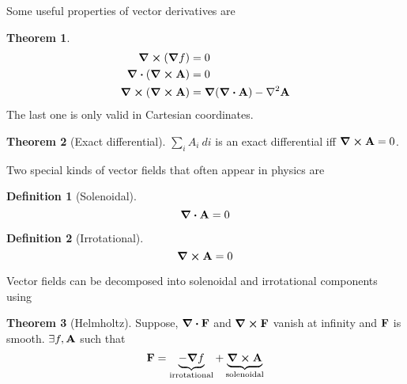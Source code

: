 \documentclass[10pt, a4paper]{extarticle}
\theoremstyle{definition}
\newtheorem{thm}{Theorem}
\newtheorem{defn}{Definition}
\begin{document}
Some useful properties of vector derivatives are
\begin{framed}
	\begin{thm}
		\begin{align*}
			\curl(\grad f)     & =0                                  \\
			\div(\curl\vb{A})  & =0                                  \\
			\curl(\curl\vb{A}) & =\grad(\div\vb{A})-\laplacian\vb{A}
		\end{align*}
		The last one is only valid in Cartesian coordinates.
	\end{thm}
\end{framed}
\begin{framed}
	\begin{thm}[Exact differential]
		$\sum_i A_i\ di$ is an exact differential iff $\curl \vb{A}=0$.
	\end{thm}
\end{framed}
Two special kinds of vector fields that often appear in physics are
\begin{framed}
	\begin{defn}[Solenoidal]
		\[\div\vb{A}=0\]
	\end{defn}
	\begin{defn}[Irrotational]
		\[\curl\vb{A}=0\]
	\end{defn}
\end{framed}
Vector fields can be decomposed into solenoidal and irrotational components using
\begin{framed}
	\begin{thm}[Helmholtz]
		Suppose, $\div \vb{F}$ and $\curl\vb{F}$ vanish at infinity and $\vb{F}$ is smooth. $\exists f,\vb{A}$ such that
		\[\vb{F}=\underbrace{-\grad f}_{\text{irrotational}}+\underbrace{\curl\vb{A}}_{\text{solenoidal}}\]
	\end{thm}
\end{framed}
\end{document}
